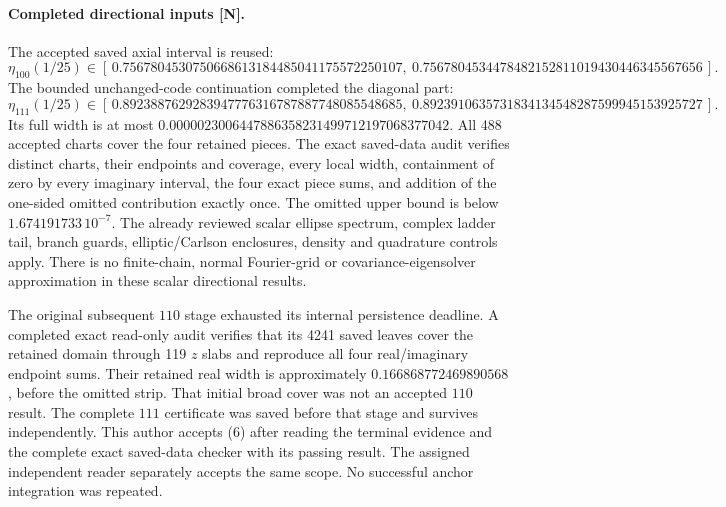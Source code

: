 \documentclass[10pt]{article}
\begin{document}
\paragraph{Completed directional inputs [N].}
The accepted saved axial interval is reused:
\[
 \eta_{100}(1/25)\in
 [\,0.7567804530750668613184485041175572250107,\ 
    0.7567804534478482152811019430446345567656\,].
                                                               \tag{5}
\]
The bounded unchanged-code continuation completed the diagonal part:
\[
 \eta_{111}(1/25)\in
 [\,0.8923887629283947776316787887748085548685,\ 
    0.8923910635731834134548287599945153925727\,].
                                                               \tag{6}
\]
Its full width is at most
$0.0000023006447886358231499712197068377042$.
All 488 accepted charts cover the four retained pieces. The exact
saved-data audit verifies distinct charts, their endpoints and
coverage, every local width, containment of zero by every imaginary
interval, the four exact piece sums, and addition of the one-sided
omitted contribution exactly once. The omitted upper bound is below
$1.674191733\,10^{-7}$. The already reviewed scalar ellipse spectrum,
complex ladder tail, branch guards, elliptic/Carlson enclosures,
density and quadrature controls apply. There is no finite-chain,
normal Fourier-grid or covariance-eigensolver approximation in
these scalar directional results.

The original subsequent $110$ stage exhausted its internal
persistence deadline. A completed exact read-only audit verifies that its
4241 saved leaves cover the retained domain through 119 $z$ slabs
and reproduce all four real/imaginary endpoint sums.
Their retained real width is approximately
$0.166868772469890568$, before the omitted strip.
That initial broad cover was not an accepted $110$ result.
The complete $111$ certificate
was saved before that stage and survives independently.
This author accepts (6) after reading the terminal evidence and
the complete exact saved-data checker with its passing result.
The assigned independent reader separately accepts the same scope.
No successful anchor integration was repeated.
\end{document}
